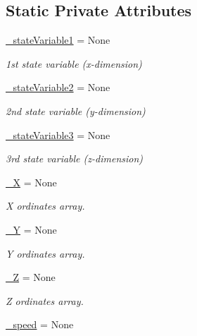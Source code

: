 \subsection*{Static Private Attributes}
\begin{DoxyCompactItemize}
\item 
\hyperlink{class_mu_mo_t_1_1_mu_mo_t_1_1_mu_mo_tfield_view_aa14fa36730691becc6f3136899545416}{\+\_\+state\+Variable1} = None
\begin{DoxyCompactList}\small\item\em 1st state variable (x-\/dimension) \end{DoxyCompactList}\item 
\hyperlink{class_mu_mo_t_1_1_mu_mo_t_1_1_mu_mo_tfield_view_a9d3705d1d9182e10751ff693573d6d16}{\+\_\+state\+Variable2} = None
\begin{DoxyCompactList}\small\item\em 2nd state variable (y-\/dimension) \end{DoxyCompactList}\item 
\hyperlink{class_mu_mo_t_1_1_mu_mo_t_1_1_mu_mo_tfield_view_ad2f8dc44173a16468bd9d3ab335f9b27}{\+\_\+state\+Variable3} = None
\begin{DoxyCompactList}\small\item\em 3rd state variable (z-\/dimension) \end{DoxyCompactList}\item 
\hyperlink{class_mu_mo_t_1_1_mu_mo_t_1_1_mu_mo_tfield_view_abb529af75494ab2513e57b8434c7c975}{\+\_\+X} = None
\begin{DoxyCompactList}\small\item\em X ordinates array. \end{DoxyCompactList}\item 
\hyperlink{class_mu_mo_t_1_1_mu_mo_t_1_1_mu_mo_tfield_view_a17bd9f55d983ee8d5a6f22088d0397e8}{\+\_\+Y} = None
\begin{DoxyCompactList}\small\item\em Y ordinates array. \end{DoxyCompactList}\item 
\hyperlink{class_mu_mo_t_1_1_mu_mo_t_1_1_mu_mo_tfield_view_a7b96cbb62a4ad08851fa147958f0d6e4}{\+\_\+Z} = None
\begin{DoxyCompactList}\small\item\em Z ordinates array. \end{DoxyCompactList}\item 
\hyperlink{class_mu_mo_t_1_1_mu_mo_t_1_1_mu_mo_tfield_view_a3293b40663039bb46c8c977a9948436e}{\+\_\+speed} = None

\end{DoxyCompactItemize}
